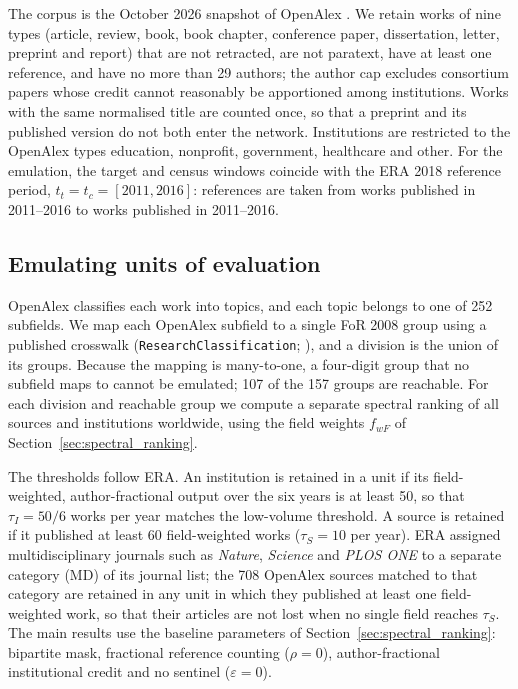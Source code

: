 The corpus is the October 2026 snapshot of OpenAlex \citep{priemOpenAlexFullyopenIndex2022}. We retain works of nine types (article, review, book, book chapter, conference paper, dissertation, letter, preprint and report) that are not retracted, are not paratext, have at least one reference, and have no more than 29 authors; the author cap excludes consortium papers whose credit cannot reasonably be apportioned among institutions. Works with the same normalised title are counted once, so that a preprint and its published version do not both enter the network. Institutions are restricted to the OpenAlex types education, nonprofit, government, healthcare and other. For the emulation, the target and census windows coincide with the ERA 2018 reference period, $t_t = t_c = [2011, 2016]$: references are taken from works published in 2011--2016 to works published in 2011--2016.

\subsection{Emulating units of evaluation}

OpenAlex classifies each work into topics, and each topic belongs to one of 252 subfields. We map each OpenAlex subfield to a single FoR 2008 group using a published crosswalk (\texttt{ResearchClassification}; %
), and a division is the union of its groups. Because the mapping is many-to-one, a four-digit group that no subfield maps to cannot be emulated; 107 of the 157 groups are reachable. For each division and reachable group we compute a separate spectral ranking of all sources and institutions worldwide, using the field weights $f_{wF}$ of Section~\ref{sec:spectral_ranking}.

The thresholds follow ERA. An institution is retained in a unit if its field-weighted, author-fractional output over the six years is at least 50, so that $\tau_I = 50/6$ works per year matches the low-volume threshold. A source is retained if it published at least 60 field-weighted works ($\tau_S = 10$ per year). ERA assigned multidisciplinary journals such as \textit{Nature}, \textit{Science} and \textit{PLOS ONE} to a separate category (MD) of its journal list; the 708 OpenAlex sources matched to that category are retained in any unit in which they published at least one field-weighted work, so that their articles are not lost when no single field reaches $\tau_S$. The main results use the baseline parameters of Section~\ref{sec:spectral_ranking}: bipartite mask, fractional reference counting ($\rho = 0$), author-fractional institutional credit and no sentinel ($\varepsilon = 0$).

